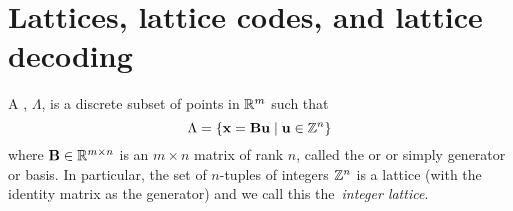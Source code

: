 \documentclass[journal]{IEEEtran}
\begin{document}




\section{Lattices, lattice codes, and lattice decoding} \label{sec:latt-latt-codes}


A , $\Lambda$, is a discrete subset of points in ${\mathbb R}^m$ such that
\[
   \Lambda = \{\mathbf{x} = \mathbf{B}\mathbf{u} \mid \mathbf{u} \in {\mathbb Z}^n \}
 \]
 where $\mathbf{B} \in {\mathbb R}^{m \times n}$ is an $m \times n$ matrix of rank $n$, called the  or  or simply generator or basis. In particular, the set of $n$-tuples of integers ${\mathbb Z}^n$ is a lattice (with the identity matrix as the generator) and we call this the~\emph{integer lattice}. %
\end{document}
